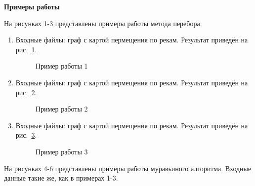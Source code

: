 \documentclass[12pt, a4paper]{article}
\begin{document}
\newpage
\begin{center}
	\textbf{Примеры работы}
\end{center}
На рисунках 1-3 представлены примеры работы метода перебора.
\begin{enumerate}
	\item Входные файлы: граф с картой пермещения по 
	рекам.
	Результат приведён на рис.~\ref{img:grap1}.
	\begin{figure}[h]
  		\caption{Пример работы 1}
  		\label{img:grap1}
	\end{figure}
	\item Входные файлы: граф с картой пермещения по 
	рекам.
	Результат приведён на рис.~\ref{img:grap2}.
	\begin{figure}[h]
  		\caption{Пример работы 2}
  		\label{img:grap2}
	\end{figure}
	\item Входные файлы: граф с картой пермещения по 
	рекам.
	Результат приведён на рис.~\ref{img:grap3}.
	\begin{figure}[h]
  		\caption{Пример работы 3}
  		\label{img:grap3}
	\end{figure}
\end{enumerate}
\newpage
На рисунках 4-6 представлены примеры работы муравьиного алгоритма. 
Входные данные такие же, как в примерах 1-3.
\end{document}

